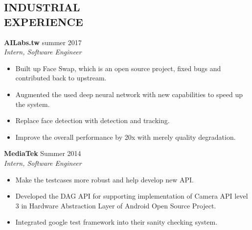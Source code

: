 \documentclass[margin, 9pt]{res} %
\begin{document}
\begin{resume}
\section{INDUSTRIAL\\ EXPERIENCE}

{\textbf{AILabs.tw}} \hfill{summer 2017}\\
{\textit{Intern, Software Engineer}}
\begin{itemize}[leftmargin=*] \itemsep -3pt
\vspace*{-5pt}
  \item Built up Face Swap, which is an open source project, fixed bugs and
  contributed back to upstream.
  \item Augmented the used deep neural network with new capabilities to speed
  up the system.
  \item Replace face detection with detection and tracking.
	\item Improve the overall performance by 20x with merely quality degradation.
\end{itemize}

\medskip
{\textbf{MediaTek}} \hfill{Summer 2014}\\
{\textit{Intern, Software Engineer}}
\begin{itemize}[leftmargin=*] \itemsep -3pt
\vspace*{-5pt}
  \item Make the testcases more robust and help develop new API.
	\item Developed the DAG API for supporting implementation of Camera API level
  3 in Hardware Abstraction Layer of Android Open Source Project.
	\item Integrated google test framework into their sanity checking system.
\end{itemize}


\end{resume}
\end{document}
